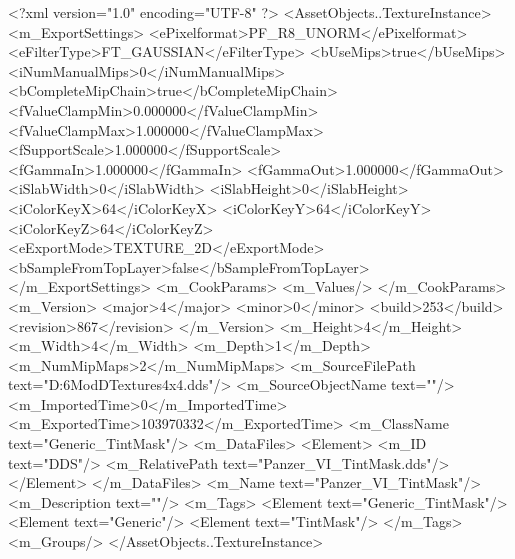 <?xml version="1.0" encoding="UTF-8" ?>
<AssetObjects..TextureInstance>
	<m_ExportSettings>
		<ePixelformat>PF_R8_UNORM</ePixelformat>
		<eFilterType>FT_GAUSSIAN</eFilterType>
		<bUseMips>true</bUseMips>
		<iNumManualMips>0</iNumManualMips>
		<bCompleteMipChain>true</bCompleteMipChain>
		<fValueClampMin>0.000000</fValueClampMin>
		<fValueClampMax>1.000000</fValueClampMax>
		<fSupportScale>1.000000</fSupportScale>
		<fGammaIn>1.000000</fGammaIn>
		<fGammaOut>1.000000</fGammaOut>
		<iSlabWidth>0</iSlabWidth>
		<iSlabHeight>0</iSlabHeight>
		<iColorKeyX>64</iColorKeyX>
		<iColorKeyY>64</iColorKeyY>
		<iColorKeyZ>64</iColorKeyZ>
		<eExportMode>TEXTURE_2D</eExportMode>
		<bSampleFromTopLayer>false</bSampleFromTopLayer>
	</m_ExportSettings>
	<m_CookParams>
		<m_Values/>
	</m_CookParams>
	<m_Version>
		<major>4</major>
		<minor>0</minor>
		<build>253</build>
		<revision>867</revision>
	</m_Version>
	<m_Height>4</m_Height>
	<m_Width>4</m_Width>
	<m_Depth>1</m_Depth>
	<m_NumMipMaps>2</m_NumMipMaps>
	<m_SourceFilePath text="D:\Civ6Mod\3D\Util Textures\black4x4.dds"/>
	<m_SourceObjectName text=""/>
	<m_ImportedTime>0</m_ImportedTime>
	<m_ExportedTime>103970332</m_ExportedTime>
	<m_ClassName text="Generic_TintMask"/>
	<m_DataFiles>
		<Element>
			<m_ID text="DDS"/>
			<m_RelativePath text="Panzer_VI_TintMask.dds"/>
		</Element>
	</m_DataFiles>
	<m_Name text="Panzer_VI_TintMask"/>
	<m_Description text=""/>
	<m_Tags>
		<Element text="Generic_TintMask"/>
		<Element text="Generic"/>
		<Element text="TintMask"/>
	</m_Tags>
	<m_Groups/>
</AssetObjects..TextureInstance>

 